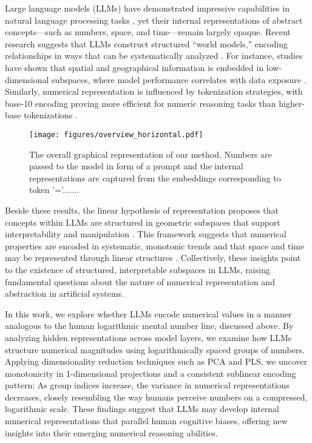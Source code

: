 Large language models (LLMs) have demonstrated impressive capabilities in natural language processing tasks \cite{touvron2023llama1,achiam2023gpt}, yet their internal representations of abstract concepts—such as numbers, space, and time—remain largely opaque. Recent research suggests that LLMs construct structured ``world models,'' encoding relationships in ways that can be systematically analyzed \cite{petroni2019language,radford2019language}. For instance, studies have shown that spatial and geographical information is embedded in low-dimensional subspaces, where model performance correlates with data exposure \cite{gurneelanguage,godey2024scaling}. Similarly, numerical representation is influenced by tokenization strategies, with base-10 encoding proving more efficient for numeric reasoning tasks than higher-base tokenizations \cite{zhou2024scaling}.

\begin{figure*}[h!]
    \centering
    \texttt{[image: figures/overview\_horizontal.pdf]} %
    \caption{The overall graphical representation of our method. Numbers are passed to the model in form of a prompt and the internal representations are captured from the embeddings corresponding to token '='.......}
    \label{fig pipeline}
\end{figure*}

Beside these results, the linear hypothesis of representation proposes that concepts within LLMs are structured in geometric subspaces that support interpretability and manipulation \cite{park2023linear}. This framework suggests that numerical properties are encoded in systematic, monotonic trends \cite{heinzerling2024monotonic} and that space and time may be represented through linear structures \cite{gurneelanguage}. Collectively, these insights point to the existence of structured, interpretable subspaces in LLMs, raising fundamental questions about the nature of numerical representation and abstraction in artificial systems.

In this work, we explore whether LLMs encode numerical values in a manner analogous to the human logarithmic mental number line, discussed above. By analyzing hidden representations across model layers, we examine how LLMs structure numerical magnitudes using logarithmically spaced groups of numbers. Applying dimensionality reduction techniques such as PCA and PLS, we uncover monotonicity in 1-dimensional projections and a consistent sublinear encoding pattern: As group indices increase, the variance in numerical representations decreases, closely resembling the way humans perceive numbers on a compressed, logarithmic scale. These findings suggest that LLMs may develop internal numerical representations that parallel human cognitive biases, offering new insights into their emerging numerical reasoning abilities.

